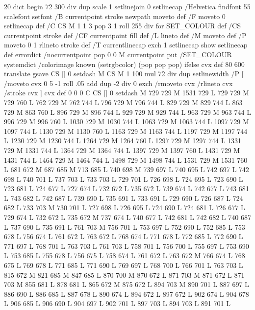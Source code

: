 {{{{{{{{{{{{{{{{{{{{{{{{{{{%
 20 dict begin
72 300 div dup scale
1 setlinejoin 0 setlinecap
/Helvetica findfont 55 scalefont setfont 
/B { currentpoint stroke newpath moveto } def
/F { moveto 0 setlinecap} def
/C { CS M 1 1 3 { pop 3 1 roll 255 div } for SET_COLOUR } def
/CS { currentpoint stroke } def
/CF { currentpoint fill } def
/L { lineto } def /M { moveto } def
/P { moveto 0 1 rlineto stroke } def
/T { currentlinecap exch 1 setlinecap show setlinecap } def
errordict /nocurrentpoint { pop 0 0 M currentpoint } put
/SET_COLOUR systemdict /colorimage known
{ (setrgbcolor) } { (pop pop pop) } ifelse cvx def
 80 600 translate
gsave
CS [] 0 setdash M
CS M 1 100 mul 72 div dup setlinewidth
/P [ /moveto cvx 0 5 -1 roll .05 add dup -2 div 0 exch /rmoveto cvx /rlineto cvx /stroke cvx ] cvx def
 0 0 0 C
CS [] 0 setdash M
729 729 M 1531 729 L
729 729 M 729 760 L
762 729 M 762 744 L
796 729 M 796 744 L
829 729 M 829 744 L
863 729 M 863 760 L
896 729 M 896 744 L
929 729 M 929 744 L
963 729 M 963 744 L
996 729 M 996 760 L
1030 729 M 1030 744 L
1063 729 M 1063 744 L
1097 729 M 1097 744 L
1130 729 M 1130 760 L
1163 729 M 1163 744 L
1197 729 M 1197 744 L
1230 729 M 1230 744 L
1264 729 M 1264 760 L
1297 729 M 1297 744 L
1331 729 M 1331 744 L
1364 729 M 1364 744 L
1397 729 M 1397 760 L
1431 729 M 1431 744 L
1464 729 M 1464 744 L
1498 729 M 1498 744 L
1531 729 M 1531 760 L
681 672 M 687 685 M 713 685 L
740 698 M 739 697 L
740 695 L
742 697 L
742 698 L
740 701 L
737 703 L
733 703 L
729 701 L
726 698 L
724 695 L
723 690 L
723 681 L
724 677 L
727 674 L
732 672 L
735 672 L
739 674 L
742 677 L
743 681 L
743 682 L
742 687 L
739 690 L
735 691 L
733 691 L
729 690 L
726 687 L
724 682 L
733 703 M 730 701 L
727 698 L
726 695 L
724 690 L
724 681 L
726 677 L
729 674 L
732 672 L
735 672 M 737 674 L
740 677 L
742 681 L
742 682 L
740 687 L
737 690 L
735 691 L
761 703 M 756 701 L
753 697 L
752 690 L
752 685 L
753 678 L
756 674 L
761 672 L
763 672 L
768 674 L
771 678 L
772 685 L
772 690 L
771 697 L
768 701 L
763 703 L
761 703 L
758 701 L
756 700 L
755 697 L
753 690 L
753 685 L
755 678 L
756 675 L
758 674 L
761 672 L
763 672 M 766 674 L
768 675 L
769 678 L
771 685 L
771 690 L
769 697 L
768 700 L
766 701 L
763 703 L
815 672 M 821 685 M 847 685 L
870 700 M 870 672 L
871 703 M 871 672 L
871 703 M 855 681 L
878 681 L
865 672 M 875 672 L
894 703 M 890 701 L
887 697 L
886 690 L
886 685 L
887 678 L
890 674 L
894 672 L
897 672 L
902 674 L
904 678 L
906 685 L
906 690 L
904 697 L
902 701 L
897 703 L
894 703 L
891 701 L
}}}}}}}}}}}}}}}}}}}}}}}}}}}
